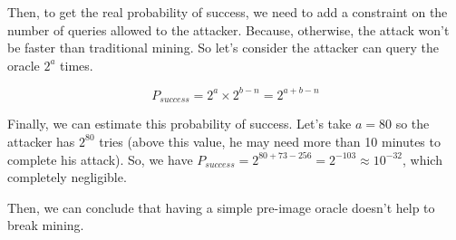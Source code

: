 Then, to get the real probability of success, we need to add a constraint on the number of queries allowed to the attacker. Because, otherwise, the attack won't be faster than traditional mining. So let's consider the attacker can query the oracle $2^a$ times.

\begin{equation}
P_{success} = 2^a \times 2^{b-n} = 2^{a + b - n}
\end{equation}
\newline

Finally, we can estimate this probability of success. Let's take $a = 80$ so the attacker has $2^{80}$ tries (above this value, he may need more than 10 minutes to complete his attack). So, we have $P_{success} = 2^{80+73-256} = 2^{-103} \approx 10^{-32}$, which completely negligible.

Then, we can conclude that having a simple pre-image oracle doesn't help to break mining.
